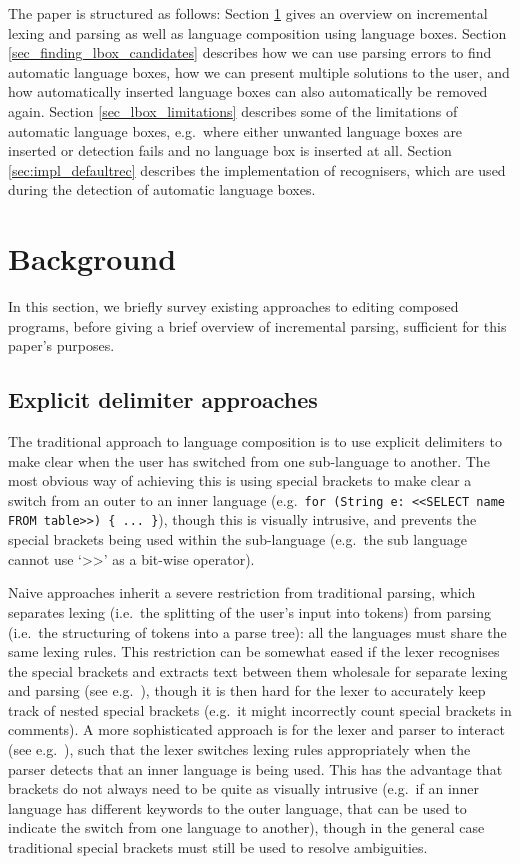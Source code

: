 \documentclass[sigplan,screen]{acmart}\settopmatter{printfolios=true,printccs=false,printacmref=false}
\begin{document}
The paper is structured as follows: Section \ref{sec_background} gives an
overview on incremental lexing and parsing as well as language composition
using language boxes. Section \ref{sec_finding_lbox_candidates}
describes how we can use parsing errors to find automatic language boxes, how
we can present multiple solutions to the user, and how automatically inserted
language boxes can also automatically be removed again. Section
\ref{sec_lbox_limitations} describes some of the limitations of automatic
language boxes, e.g.~where either unwanted language boxes are inserted or
detection fails and no language box is inserted at all. Section
\ref{sec:impl_defaultrec} describes the implementation of recognisers, which
are used during the detection of automatic language boxes.



\section{Background}
\label{sec_background}

In this section, we briefly survey existing approaches to editing composed
programs, before giving a brief overview of incremental parsing, sufficient for
this paper's purposes.

\subsection{Explicit delimiter approaches}

The traditional approach to language composition is to use explicit delimiters
to make clear when the user has switched from one sub-language to another. The
most obvious way of achieving this is using special brackets to make clear a
switch from an outer to an inner language (e.g.~\texttt{for (String e: <<SELECT name
FROM table>>) \{ ... \}}), though this is visually intrusive, and prevents the
special brackets being used within the sub-language (e.g.~the sub language
cannot use `>>' as a bit-wise operator).

Naive approaches inherit a severe restriction from traditional parsing, which
separates lexing (i.e.~the splitting of the user's input into tokens) from
parsing (i.e.~the structuring of tokens into a parse tree): all the languages
must share the same lexing rules. This restriction can be somewhat eased if the
lexer recognises the special brackets and extracts text between them wholesale
for separate lexing and parsing (see e.g.~\cite[p.~13-14]{tratt08domain}),
though it is then hard for the lexer to accurately keep track of nested special
brackets (e.g.~it might incorrectly count special brackets in comments).  A
more sophisticated approach is for the lexer and parser to interact (see
e.g.~\cite{wyk07context}), such that the lexer switches lexing rules
appropriately when the parser detects that an inner language is being used.
This has the advantage that brackets do not always need to be quite as visually
intrusive (e.g.~if an inner language has different keywords to the outer
language, that can be used to indicate the switch from one language to
another), though in the general case traditional special brackets must still be
used to resolve ambiguities.
\end{document}
